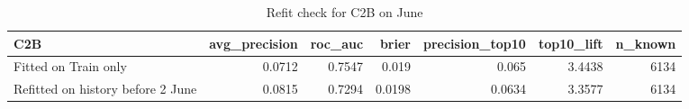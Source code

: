 \begin{table}[htbp]
\centering
\small
\caption{Refit check for C2B on June}
\begin{tabular}{lrrrrrr}
\toprule
C2B & avg\_precision & roc\_auc & brier & precision\_top10 & top10\_lift & n\_known \\
\midrule
Fitted on Train only & 0.0712 & 0.7547 & 0.019 & 0.065 & 3.4438 & 6134 \\
Refitted on history before 2 June & 0.0815 & 0.7294 & 0.0198 & 0.0634 & 3.3577 & 6134 \\
\bottomrule
\end{tabular}
\par\smallskip\begin{minipage}{\linewidth}\footnotesize \end{minipage}
\end{table}

